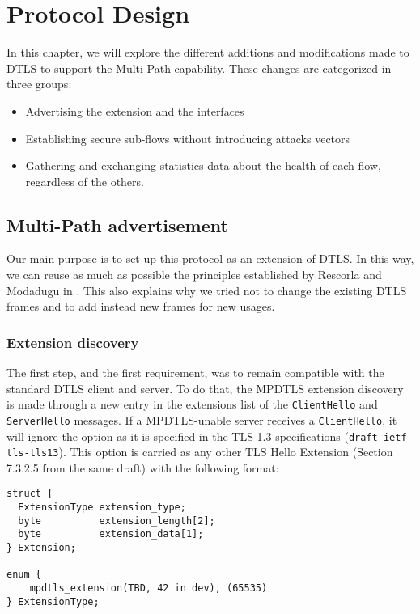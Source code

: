 \chapter{Protocol Design}\label{chap:design}

In this chapter, we will explore the different additions and modifications made to DTLS to support the Multi Path capability. These changes are categorized in three groups:
\begin{itemize}
\item Advertising the extension and the interfaces
\item Establishing secure sub-flows without introducing attacks vectors
\item Gathering and exchanging statistics data about the health of each flow, regardless of the others. 
\end{itemize}


\section{Multi-Path advertisement}

Our main purpose is to set up this protocol as an extension of DTLS. In this way, we can reuse as much as possible the principles established by Rescorla and Modadugu in \cite{modadugu2004design}. This also explains why we tried not to change the existing DTLS frames and to add instead new frames for new usages.

\subsection{Extension discovery}

The first step, and the first requirement, was to remain compatible with the standard DTLS client and server. To do that, the MPDTLS extension discovery is made through a new entry in the extensions list of the \texttt{ClientHello} and \texttt{ServerHello} messages. If a MPDTLS-unable server receives a \texttt{ClientHello}, it will ignore the option as it is specified in the TLS 1.3 specifications (\texttt{draft-ietf-tls-tls13}\cite{draft-tls13}). This option is carried as any other TLS Hello Extension (Section 7.3.2.5 from the same draft) with the following format:

\begin{lstlisting}[caption=MultiPath DTLS Extension structure, label=lst:extension]
struct {
  ExtensionType extension_type;
  byte          extension_length[2];
  byte          extension_data[1];
} Extension;

enum {
    mpdtls_extension(TBD, 42 in dev), (65535)
} ExtensionType;
\end{lstlisting}

